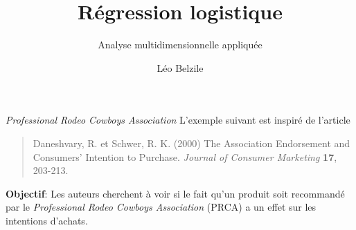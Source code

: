 \documentclass[
  ignorenonframetext,
]{beamer}
\title{Régression logistique}
\subtitle{Analyse multidimensionnelle appliquée}
\author{Léo Belzile}
\date{}
\institute{HEC Montréal}
\begin{document}
\frame{\titlepage}
\ifdefined\Shaded\renewenvironment{Shaded}{\begin{tcolorbox}[boxrule=0pt, borderline west={3pt}{0pt}{shadecolor}, sharp corners, enhanced, breakable, interior hidden, frame hidden]}{\end{tcolorbox}}\fi

\begin{frame}{\emph{Professional Rodeo Cowboys Association}}
\protect\hypertarget{cowboy}{}
L'exemple suivant est inspiré de l'article

\begin{quote}
Daneshvary, R. et Schwer, R. K. (2000) The Association Endorsement and
Consumers' Intention to Purchase. \emph{Journal of Consumer Marketing}
\textbf{17}, 203-213.
\end{quote}

\textbf{Objectif}: Les auteurs cherchent à voir si le fait qu'un produit
soit recommandé par le \emph{Professional Rodeo Cowboys Association}
(PRCA) a un effet sur les intentions d'achats.
\end{frame}
\end{document}

